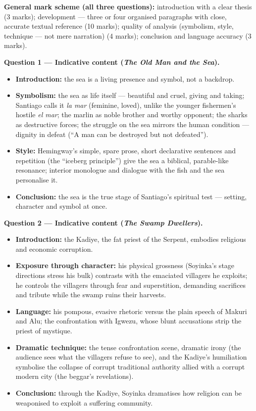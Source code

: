 \documentclass[11pt]{article}
\begin{document}
\begin{corrige}
\textbf{General mark scheme (all three questions):} introduction with a clear thesis (3 marks); development — three or four organised paragraphs with close, accurate textual reference (10 marks); quality of analysis (symbolism, style, technique — not mere narration) (4 marks); conclusion and language accuracy (3 marks).

\textbf{Question 1 — Indicative content (\emph{The Old Man and the Sea}).}
\begin{itemize}
\item \textbf{Introduction:} the sea is a living presence and symbol, not a backdrop.
\item \textbf{Symbolism:} the sea as life itself — beautiful and cruel, giving and taking; Santiago calls it \emph{la mar} (feminine, loved), unlike the younger fishermen's hostile \emph{el mar}; the marlin as noble brother and worthy opponent; the sharks as destructive forces; the struggle on the sea mirrors the human condition — dignity in defeat (``A man can be destroyed but not defeated'').
\item \textbf{Style:} Hemingway's simple, spare prose, short declarative sentences and repetition (the ``iceberg principle'') give the sea a biblical, parable-like resonance; interior monologue and dialogue with the fish and the sea personalise it.
\item \textbf{Conclusion:} the sea is the true stage of Santiago's spiritual test — setting, character and symbol at once.
\end{itemize}

\textbf{Question 2 — Indicative content (\emph{The Swamp Dwellers}).}
\begin{itemize}
\item \textbf{Introduction:} the Kadiye, the fat priest of the Serpent, embodies religious and economic corruption.
\item \textbf{Exposure through character:} his physical grossness (Soyinka's stage directions stress his bulk) contrasts with the emaciated villagers he exploits; he controls the villagers through fear and superstition, demanding sacrifices and tribute while the swamp ruins their harvests.
\item \textbf{Language:} his pompous, evasive rhetoric versus the plain speech of Makuri and Alu; the confrontation with Igwezu, whose blunt accusations strip the priest of mystique.
\item \textbf{Dramatic technique:} the tense confrontation scene, dramatic irony (the audience sees what the villagers refuse to see), and the Kadiye's humiliation symbolise the collapse of corrupt traditional authority allied with a corrupt modern city (the beggar's revelations).
\item \textbf{Conclusion:} through the Kadiye, Soyinka dramatises how religion can be weaponised to exploit a suffering community.
\end{itemize}


\end{corrige}
\end{document}
